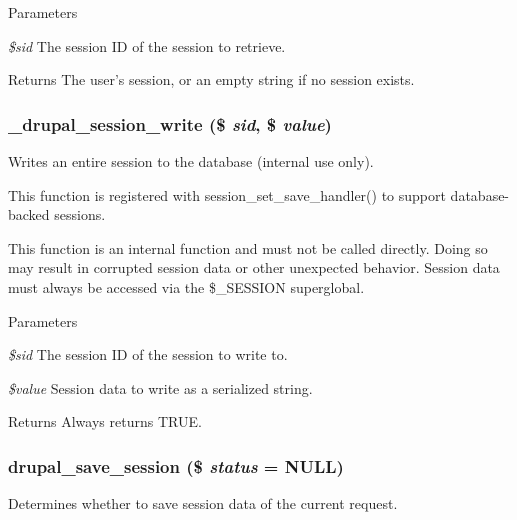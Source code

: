\begin{DoxyParams}{Parameters}
\item[{\em \$sid}]The session ID of the session to retrieve.\end{DoxyParams}
\begin{DoxyReturn}{Returns}
The user's session, or an empty string if no session exists. 
\end{DoxyReturn}
\hypertarget{session_8inc_a4c7b4bd789e8a27c6c7078cb1a32f8f9}{
\subsubsection[{\_\-drupal\_\-session\_\-write}]{\setlength{\rightskip}{0pt plus 5cm}\_\-drupal\_\-session\_\-write (\$ {\em sid}, \/  \$ {\em value})}}
\label{session_8inc_a4c7b4bd789e8a27c6c7078cb1a32f8f9}
Writes an entire session to the database (internal use only).

This function is registered with session\_\-set\_\-save\_\-handler() to support database-\/backed sessions.

This function is an internal function and must not be called directly. Doing so may result in corrupted session data or other unexpected behavior. Session data must always be accessed via the \$\_\-SESSION superglobal.


\begin{DoxyParams}{Parameters}
\item[{\em \$sid}]The session ID of the session to write to. \item[{\em \$value}]Session data to write as a serialized string.\end{DoxyParams}
\begin{DoxyReturn}{Returns}
Always returns TRUE. 
\end{DoxyReturn}
\hypertarget{session_8inc_a2e1c6443b96a7018027383ca39585ce7}{
\subsubsection[{drupal\_\-save\_\-session}]{\setlength{\rightskip}{0pt plus 5cm}drupal\_\-save\_\-session (\$ {\em status} = {\ttfamily NULL})}}
\label{session_8inc_a2e1c6443b96a7018027383ca39585ce7}
Determines whether to save session data of the current request.

